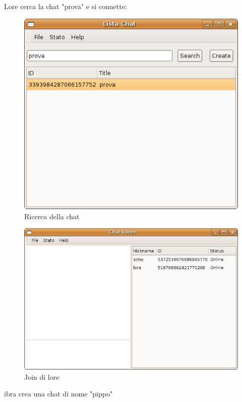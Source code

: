 Lore cerca la chat "prova" e si connette:
\begin{figure}[H]
\begin{center}
\includegraphics[scale=0.5]{etc/ricerca_lore.png}
\caption{Ricerca della chat}
\label{ricerca\_lore}
\end{center}
\end{figure}
\begin{figure}[H]
\begin{center}
\includegraphics[scale=0.5]{etc/join_lore.png}
\caption{Join di lore}
\label{join\_lore}
\end{center}
\end{figure}
ibra crea una chat di nome "pippo"
